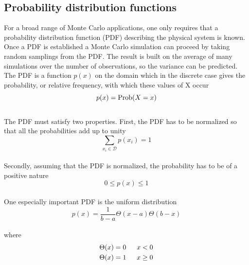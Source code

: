 \documentclass[%
reprint,nofootinbib,
amsmath,amssymb,
aps,
]{revtex4-1}
\begin{document}
\subsection*{Probability distribution functions}\noindent
For a broad range of Monte Carlo applications, one only requires that a probability distribution function (PDF) describing the physical system is known. Once a PDF is established a Monte Carlo simulation can proceed by taking random samplings from the PDF. The result is built on the average of many simulations over the number of observations, so the variance can be predicted. The PDF is a function $p(x)$ on the domain which in the discrete case gives the probability, or relative frequency, with which these values of X occur \vspace{0.5mm} \\
\begin{equation*}
p(x) = \textnormal{Prob}(X=x)
\end{equation*}\vspace{0.5mm} \\
The PDF must satisfy two properties. First, the PDF has to be normalized so that all the probabilities add up to unity\vspace{0.5mm} \\
\begin{equation*}
\sum_{x_i\in \mathcal{D}} p(x_i) = 1
\end{equation*} \vspace{0.5mm} \\
Secondly, assuming that the PDF is normalized, the probability has to be of a positive nature \vspace{0.5mm} \\
\begin{equation*}
0 \leq p(x) \leq 1
\end{equation*}\vspace{0.5mm} \\
One especially important PDF is the uniform distribution\vspace{2mm} \\
\begin{equation}\label{unipdf}
p(x) = \dfrac{1}{b-a}\Theta(x-a)\Theta(b-x)
\end{equation}\vspace{0.5mm} \\
where 
\begin{align}
\Theta(x) &= 0& \hspace{2mm} x < 0 \nonumber \\
\Theta(x) &= 1& \hspace{2mm} x \geq 0 
\end{align}\\ 
\end{document}
